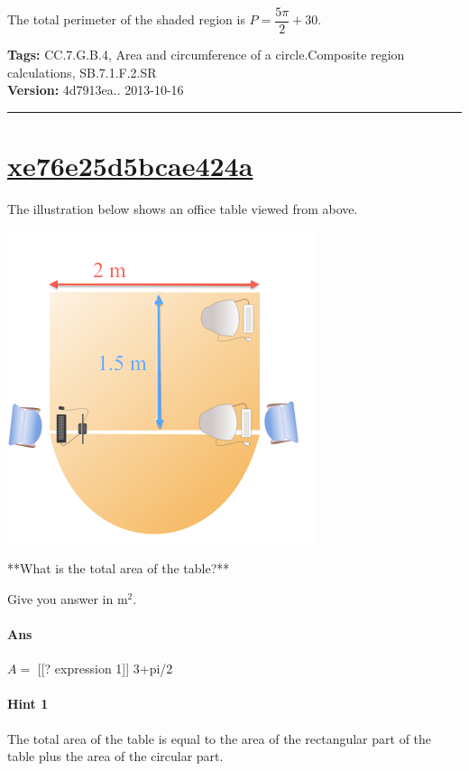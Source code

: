 \documentclass[twocolumn,10pt]{article}
\def\shrinkfactor{0.45}
\begin{document}
The total perimeter of the shaded region is $P=\dfrac{5\pi}{2}+ 30$.



\medskip
\noindent
\textbf{Tags:} {\footnotesize CC.7.G.B.4, Area and circumference of a circle.Composite region calculations, SB.7.1.F.2.SR}\\
\textbf{Version:} 4d7913ea.. 2013-10-16
\smallskip\hrule





\section{\href{https://www.khanacademy.org/devadmin/content/items/xe76e25d5bcae424a}{xe76e25d5bcae424a}}

\noindent
The illustration below shows an office table viewed from above.  

\includegraphics[scale=\shrinkfactor]{figures/2e7c87313a5fdbe0bacdee8a3f8f46418add2f40.png}

**What is the total area of the table?**  

Give you answer in $\text{m}^2$.

\paragraph{Ans} $A=$ 
[[? expression 1]]  3+pi/2

\paragraph{Hint 1}The total area of the table is equal to the area of the rectangular part of the table plus the area of the circular part.
\end{document}
